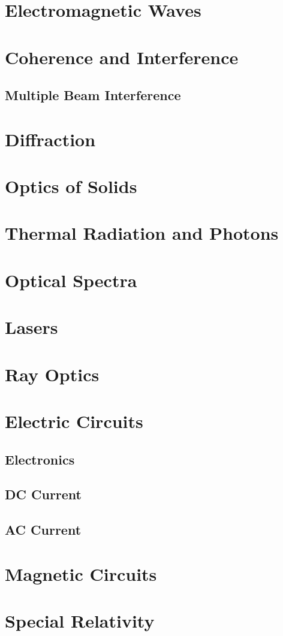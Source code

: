 \documentclass{book}
\theoremstyle{definition}
\theoremstyle{remark}
\begin{document}
\chapter{Electromagnetic Waves}

\chapter{Coherence and Interference}
\section{Multiple Beam Interference}
\chapter{Diffraction}
\chapter{Optics of Solids}
\chapter{Thermal Radiation and Photons}
\chapter{Optical Spectra}
\chapter{Lasers}
\chapter{Ray Optics}
\appendix
\chapter{Electric Circuits}
\section{Electronics}
\section{DC Current}
\section{AC Current}
\chapter{Magnetic Circuits}
\chapter{Special Relativity}

\nocite{griffem,jackson,landau2,zangwillem}
\printbibliography
\end{document}

